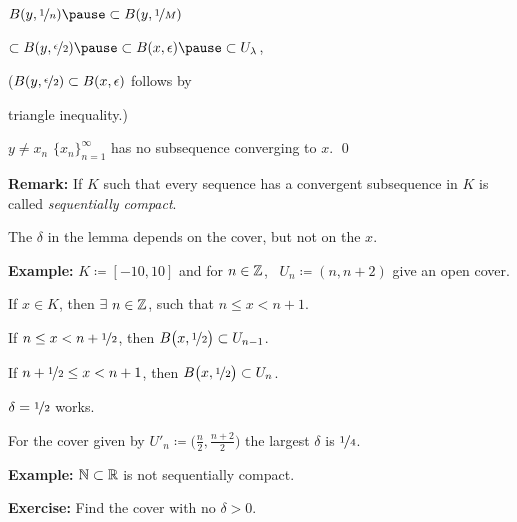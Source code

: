 \documentclass[10pt,aspectratio=149]{beamer}
\begin{document}
\begin{frame}
\pause
\medskip

$
B(y,\nicefrac{1}{n})
\pause
\subset
B(y,\nicefrac{1}{M})
$

\pause
\qquad $
\subset
B(y,\nicefrac{\epsilon}{2})
\pause
\subset
B(x,\epsilon)
\pause
\subset
U_\lambda$,

\pause
\vspace*{-0.9in}
\hspace*{2.3in}
\vspace*{-0.5in}

\pause
($B(y,\nicefrac{\epsilon}{2}) \subset B(x,\epsilon)$ follows by

triangle inequality.)

\pause
\medskip

\thus \quad $y \not= x_n$ \wthus $\{ x_n \}_{n=1}^\infty$
has no subsequence converging to $x$.
\qed

\end{frame}

\begin{frame}

\textbf{Remark:} If $K$ such that every sequence has a convergent subsequence in
$K$ is called \emph{sequentially compact}.

\pause
\medskip

The $\delta$ in the lemma depends on the cover, but not on the $x$.

\pause
\medskip

\textbf{Example:} $K \coloneqq [-10,10]$ and for $n \in {\mathbb{Z}}$,~
$U_n \coloneqq (n,n+2)$ give an open cover.

\pause
If $x \in K$, then $\exists$ $n \in {\mathbb{Z}}$, such that $n \leq x < n+1$.

\pause
If $n \leq x < n+\nicefrac{1}{2}$, then
$B\bigl(x,\nicefrac{1}{2}\bigr) \subset U_{n-1}$.

\pause
If $n+ \nicefrac{1}{2} \leq x < n+1$, then
$B\bigl(x,\nicefrac{1}{2}\bigr) \subset U_{n}$.

\pause
\thus \quad $\delta = \nicefrac{1}{2}$ works.

\pause
\medskip

For the cover given by
$U'_n \coloneqq \bigl(\frac{n}{2},\frac{n+2}{2} \bigr)$
the largest $\delta$ is
$\nicefrac{1}{4}$.

\pause
\medskip

\textbf{Example:}
${\mathbb{N}} \subset {\mathbb{R}}$ is not sequentially compact.

\pause
\textbf{Exercise:} Find the cover with no $\delta > 0$.

\end{frame}
\end{document}
